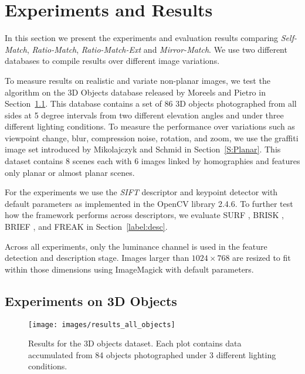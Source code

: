 \documentclass[10pt,journal,cspaper,compsoc]{IEEEtran}
\begin{document}
\section{Experiments and Results}
\label{S:Experiments}
%
In this section we present the experiments and evaluation results comparing 
\emph{Self-Match}, \emph{Ratio-Match}, \emph{Ratio-Match-Ext} and 
\emph{Mirror-Match}. We use two different databases to compile 
results over different image variations.  

To measure results on realistic and 
variate non-planar images, we test the algorithm on the 3D Objects 
database released by Moreels and Pietro \cite{moreels2007evaluation} in 
Section~\ref{S:3dobjects}. This database contains a set of 86 3D objects 
photographed from all sides at 5 degree intervals from two different 
elevation angles and under three different lighting conditions.
To measure the performance over variations such as viewpoint change, 
blur, compression noise, rotation, and zoom, we use the graffiti 
image set introduced by Mikolajczyk and Schmid 
\cite{mikolajczyk2005performance} in Section~\ref{S:Planar}.  This 
dataset contains 8 scenes each with 6 images linked by homographies and 
features only planar or almost planar scenes.

For the experiments we use the \emph{SIFT} descriptor and keypoint 
detector with default parameters as implemented in the OpenCV library 
2.4.6.  To further test how the framework performs across descriptors, we 
evaluate SURF \cite{bay2006surf}, BRISK \cite{leutenegger2011brisk}, 
BRIEF \cite{calonder2010brief}, and FREAK \cite{alahi2012freak} in 
Section~\ref{label:desc}. 

Across all experiments, only the luminance channel is used in the feature detection and description stage.  
Images larger than $1024\!\times\!768$ are resized to fit within those dimensions using 
ImageMagick with default parameters.  

\subsection{Experiments on 3D Objects}
\label{S:3dobjects}


\begin{figure*}[t]
	\centering
    \texttt{[image: images/results\_all\_objects]}
    \caption{Results for the 3D objects dataset. Each plot 
    contains data accumulated from 84 objects photographed under 3 
different lighting conditions.}
    \label{fig:all_objects}
\end{figure*}
\end{document}
